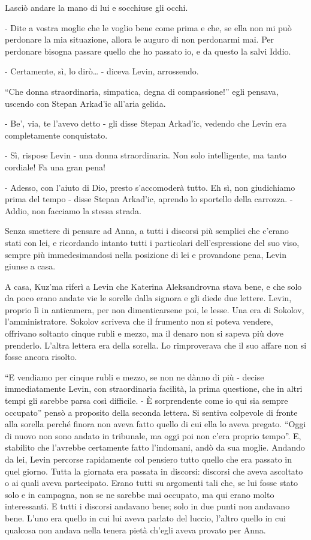 Lasciò andare la mano di lui e socchiuse gli occhi. 

- Dite a vostra moglie che le voglio bene come prima e che, se ella non mi può perdonare la mia situazione, allora le auguro di non perdonarmi mai. Per perdonare bisogna passare quello che ho passato io, e da questo la salvi Iddio. 

- Certamente, sì, lo dirò\ldots{} - diceva Levin, arrossendo. 

\label{xi-6} 

``Che donna straordinaria, simpatica, degna di compassione!'' egli pensava, uscendo con Stepan Arkad'ic all'aria gelida. 

- Be', via, te l'avevo detto - gli disse Stepan Arkad'ic, vedendo che Levin era completamente conquistato. 

- Sì, rispose Levin - una donna straordinaria. Non solo intelligente, ma tanto cordiale! Fa una gran pena! 

- Adesso, con l'aiuto di Dio, presto s'accomoderà tutto. Eh sì, non giudichiamo prima del tempo - disse Stepan Arkad'ic, aprendo lo sportello della carrozza. - Addio, non facciamo la stessa strada. 

Senza smettere di pensare ad Anna, a tutti i discorsi più semplici che c'erano stati con lei, e ricordando intanto tutti i particolari dell'espressione del suo viso, sempre più immedesimandosi nella posizione di lei e provandone pena, Levin giunse a casa. 

A casa, Kuz'ma riferì a Levin che Katerina Aleksandrovna stava bene, e che solo da poco erano andate vie le sorelle dalla signora e gli diede due lettere. Levin, proprio lì in anticamera, per non dimenticarsene poi, le lesse. Una era di Sokolov, l'amministratore. Sokolov scriveva che il frumento non si poteva vendere, offrivano soltanto cinque rubli e mezzo, ma il denaro non si sapeva più dove prenderlo. L'altra lettera era della sorella. Lo rimproverava che il suo affare non si fosse ancora risolto. 

``E vendiamo per cinque rubli e mezzo, se non ne dànno di più - decise immediatamente Levin, con straordinaria facilità, la prima questione, che in altri tempi gli sarebbe parsa così difficile. - È sorprendente come io qui sia sempre occupato'' pensò a proposito della seconda lettera. Si sentiva colpevole di fronte alla sorella perché finora non aveva fatto quello di cui ella lo aveva pregato. ``Oggi di nuovo non sono andato in tribunale, ma oggi poi non c'era proprio tempo''. E, stabilito che l'avrebbe certamente fatto l'indomani, andò da sua moglie. Andando da lei, Levin percorse rapidamente col pensiero tutto quello che era passato in quel giorno. Tutta la giornata era passata in discorsi: discorsi che aveva ascoltato o ai quali aveva partecipato. Erano tutti su argomenti tali che, se lui fosse stato solo e in campagna, non se ne sarebbe mai occupato, ma qui erano molto interessanti. E tutti i discorsi andavano bene; solo in due punti non andavano bene. L'uno era quello in cui lui aveva parlato del luccio, l'altro quello in cui qualcosa non andava nella tenera pietà ch'egli aveva provato per Anna. 

